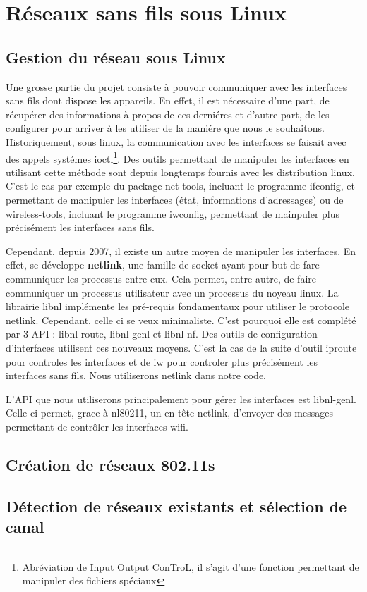 \chapter{Réseaux sans fils sous Linux}
\section{Gestion du réseau sous Linux}

Une grosse partie du projet consiste à pouvoir communiquer avec les interfaces sans fils dont dispose les appareils. En effet,
il est nécessaire d'une part, de récupérer des informations à propos de ces derniéres et d'autre part, de les configurer pour
arriver à les utiliser de la maniére que nous le souhaitons. Historiquement, sous linux, la communication avec les interfaces
se faisait avec des appels systémes ioctl\footnote{Abréviation de Input Output ConTroL, il s'agit d'une fonction permettant 
de manipuler des fichiers spéciaux}. Des outils permettant de manipuler les interfaces en utilisant cette méthode sont depuis 
longtemps fournis avec les distribution linux. C'est le cas par exemple du package net-tools, incluant le programme ifconfig,
et permettant de manipuler les interfaces (état, informations d'adressages) ou de wireless-tools, incluant le programme iwconfig,
permettant de mainpuler plus précisément les interfaces sans fils.

Cependant, depuis 2007, il existe un autre moyen de manipuler les interfaces. En effet, se développe \textbf{netlink}, une
famille de socket ayant pour but de fare communiquer les processus entre eux. Cela permet, entre autre, de faire communiquer
un processus utilisateur avec un processus du noyeau linux. La librairie libnl implémente les pré-requis fondamentaux pour 
utiliser le protocole netlink. Cependant, celle ci se veux minimaliste. C'est pourquoi elle est complété par 3 API : libnl-route,
libnl-genl et libnl-nf\cite{NLlibs}. Des outils de configuration d'interfaces utilisent ces nouveaux moyens. C'est la cas de 
la suite d'outil iproute pour controles les interfaces et de iw pour controler plus précisément les interfaces sans fils. Nous 
utiliserons netlink dans notre code.

L'API que nous utiliserons principalement pour gérer les interfaces est libnl-genl. Celle ci permet, grace à nl80211, un
en-tête netlink, d'envoyer des messages permettant de contrôler les interfaces wifi. 

\section{Création de réseaux 802.11s}
\section{Détection de réseaux existants et sélection de canal}